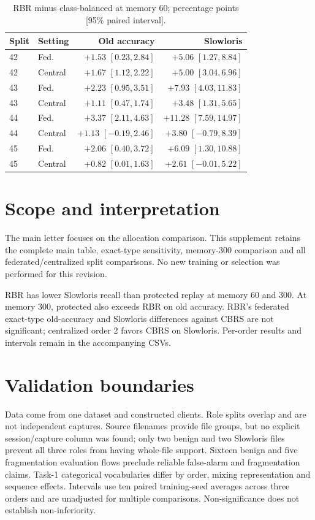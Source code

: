 \documentclass[10pt]{article}
\begin{document}
\begin{table}[!ht]
\centering
\caption{RBR minus class-balanced at memory 60; percentage points [95\% paired interval].}
\label{tab:splits}
\footnotesize
\setlength{\tabcolsep}{3pt}
\begin{tabular}{llrr}
\toprule
Split & Setting & Old accuracy & Slowloris\\
\midrule
42 & Fed. & $+1.53$ $[0.23,2.84]$ & $+5.06$ $[1.27,8.84]$\\
42 & Central & $+1.67$ $[1.12,2.22]$ & $+5.00$ $[3.04,6.96]$\\
43 & Fed. & $+2.23$ $[0.95,3.51]$ & $+7.93$ $[4.03,11.83]$\\
43 & Central & $+1.11$ $[0.47,1.74]$ & $+3.48$ $[1.31,5.65]$\\
44 & Fed. & $+3.37$ $[2.11,4.63]$ & $+11.28$ $[7.59,14.97]$\\
44 & Central & $+1.13$ $[-0.19,2.46]$ & $+3.80$ $[-0.79,8.39]$\\
45 & Fed. & $+2.06$ $[0.40,3.72]$ & $+6.09$ $[1.30,10.88]$\\
45 & Central & $+0.82$ $[0.01,1.63]$ & $+2.61$ $[-0.01,5.22]$\\
\bottomrule
\end{tabular}
\end{table}


\section*{Scope and interpretation}
The main letter focuses on the allocation comparison. This supplement retains the complete main table, exact-type sensitivity, memory-300 comparison and all federated/centralized split comparisons. No new training or selection was performed for this revision.

RBR has lower Slowloris recall than protected replay at memory 60 and 300. At memory 300, protected also exceeds RBR on old accuracy. RBR's federated exact-type old-accuracy and Slowloris differences against CBRS are not significant; centralized order 2 favors CBRS on Slowloris. Per-order results and intervals remain in the accompanying CSVs.

\section*{Validation boundaries}
Data come from one dataset and constructed clients. Role splits overlap and are not independent captures. Source filenames provide file groups, but no explicit session/capture column was found; only two benign and two Slowloris files prevent all three roles from having whole-file support. Sixteen benign and five fragmentation evaluation flows preclude reliable false-alarm and fragmentation claims. Task-1 categorical vocabularies differ by order, mixing representation and sequence effects. Intervals use ten paired training-seed averages across three orders and are unadjusted for multiple comparisons. Non-significance does not establish non-inferiority.
\end{document}
